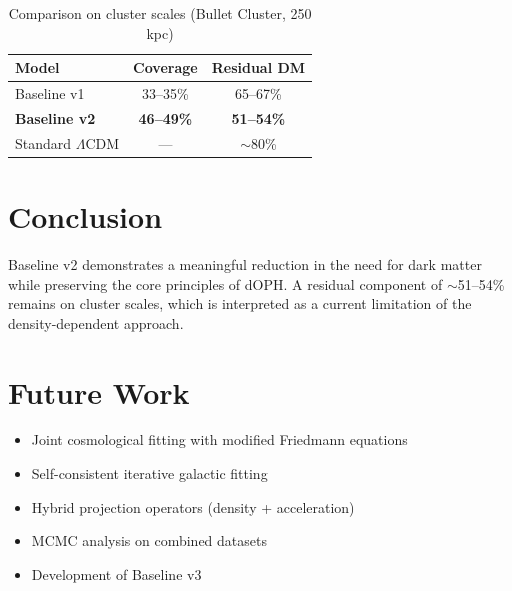 \documentclass[11pt,a4paper]{article}
\begin{document}
\begin{table}[htbp]
\centering
\caption{Comparison on cluster scales (Bullet Cluster, 250 kpc)}
\label{tab:cluster}
\begin{tabular}{lcc}
\toprule
Model & Coverage & Residual DM \\
\midrule
Baseline v1 & 33--35\% & 65--67\% \\
\textbf{Baseline v2} & \textbf{46--49\%} & \textbf{51--54\%} \\
Standard $\Lambda$CDM & — & $\sim$80\% \\
\bottomrule
\end{tabular}
\end{table}

\section{Conclusion}

Baseline v2 demonstrates a meaningful reduction in the need for dark matter while preserving the core principles of dOPH. A residual component of $\sim$51--54\% remains on cluster scales, which is interpreted as a current limitation of the density-dependent approach.

\section{Future Work}

\begin{itemize}
    \item Joint cosmological fitting with modified Friedmann equations
    \item Self-consistent iterative galactic fitting
    \item Hybrid projection operators (density + acceleration)
    \item MCMC analysis on combined datasets
    \item Development of Baseline v3
\end{itemize}
\end{document}

